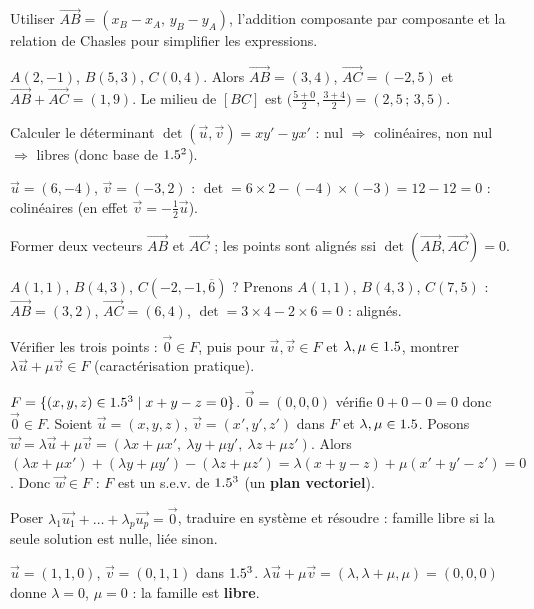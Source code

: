 Utiliser $\vec{AB}=(x_B-x_A,\,y_B-y_A)$, l'addition composante par composante et la relation de
Chasles pour simplifier les expressions.
\begin{exemple}
$A(2,-1)$, $B(5,3)$, $C(0,4)$. Alors $\vec{AB}=(3,4)$, $\vec{AC}=(-2,5)$ et
$\vec{AB}+\vec{AC}=(1,9)$. Le milieu de $[BC]$ est $\big(\tfrac{5+0}2,\tfrac{3+4}2\big)=(2{,}5\,;\,3{,}5)$.
\end{exemple}

Calculer le déterminant $\det(\vec u,\vec v)=xy'-yx'$ : nul $\Rightarrow$ colinéaires, non nul
$\Rightarrow$ libres (donc base de $1.5^2$).
\begin{exemple}
$\vec u=(6,-4)$, $\vec v=(-3,2)$ : $\det=6\times2-(-4)\times(-3)=12-12=0$ : colinéaires
(en effet $\vec v=-\tfrac12\vec u$).
\end{exemple}

Former deux vecteurs $\vec{AB}$ et $\vec{AC}$ ; les points sont alignés ssi
$\det(\vec{AB},\vec{AC})=0$.
\begin{exemple}
$A(1,1)$, $B(4,3)$, $C(-2,-1{,}\overline{6})$ ? Prenons $A(1,1)$, $B(4,3)$, $C(7,5)$ :
$\vec{AB}=(3,2)$, $\vec{AC}=(6,4)$, $\det=3\times4-2\times6=0$ : alignés.
\end{exemple}

Vérifier les trois points : $\vec 0\in F$, puis pour $\vec u,\vec v\in F$ et $\lambda,\mu\in1.5$,
montrer $\lambda\vec u+\mu\vec v\in F$ (caractérisation pratique).
\begin{exemple}
$F=\{(x,y,z)\in1.5^3\mid x+y-z=0\}$. \;$\vec 0=(0,0,0)$ vérifie $0+0-0=0$ donc $\vec 0\in F$.
Soient $\vec u=(x,y,z)$, $\vec v=(x',y',z')$ dans $F$ et $\lambda,\mu\in1.5$. Posons
$\vec w=\lambda\vec u+\mu\vec v=(\lambda x+\mu x',\ \lambda y+\mu y',\ \lambda z+\mu z')$.
Alors $(\lambda x+\mu x')+(\lambda y+\mu y')-(\lambda z+\mu z')=\lambda(x+y-z)+\mu(x'+y'-z')=0$.
Donc $\vec w\in F$ : $F$ est un s.e.v. de $1.5^3$ (un \textbf{plan vectoriel}).
\end{exemple}

Poser $\lambda_1\vec{u_1}+\dots+\lambda_p\vec{u_p}=\vec 0$, traduire en système et résoudre :
famille libre si la seule solution est nulle, liée sinon.
\begin{exemple}
$\vec u=(1,1,0)$, $\vec v=(0,1,1)$ dans $1.5^3$. $\lambda\vec u+\mu\vec v=(\lambda,\lambda+\mu,\mu)=(0,0,0)$
donne $\lambda=0$, $\mu=0$ : la famille est \textbf{libre}.
\end{exemple}

